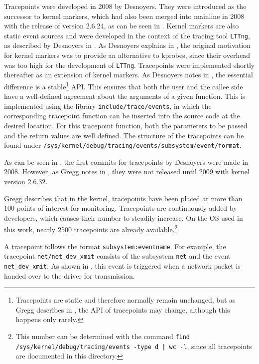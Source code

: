 Tracepoints were developed in 2008 by Desnoyers.  
They were introduced as the successor to kernel markers, which had also been merged into mainline in 2008 with the release of version 2.6.24, as can be seen in \cite{kernel_markers-changelog}.  
Kernel markers are also static event sources and were developed in the context of the tracing tool \texttt{LTTng}, as described by Desnoyers in \cite{lttng_kernel_markers}.  
As Desnoyers explains in \cite[p. 170]{Desnoyers2009}, the original motivation for kernel markers was to provide an alternative to \acp{kprobe}, since their overhead was too high for the development of \texttt{LTTng}.  
Tracepoints were implemented shortly thereafter as an extension of kernel markers.  
As Desnoyers notes in \cite[p. 171]{Desnoyers2009}, the essential difference is a stable\footnote{Tracepoints are static and therefore normally remain unchanged, but as Gregg describes in \cite[Chap. 2.9]{Gregg_2020}, the API of tracepoints may change, although this happens only rarely.} API.  
This ensures that both the user and the callee side have a well-defined agreement about the arguments of a given function.  
This is implemented using the library \texttt{include/trace/events}, in which the corresponding tracepoint function can be inserted into the source code at the desired location.  
For this tracepoint function, both the parameters to be passed and the return values are well defined.  
The structure of the tracepoints can be found under \texttt{/sys/kernel/debug/tracing/events/subsystem/event/format}.

As can be seen in \cite{tracepoints_commit}, the first commits for tracepoints by Desnoyers were made in 2008.  
However, as Gregg notes in \cite[Chap. 2.9]{Gregg_2020}, they were not released until 2009 with kernel version 2.6.32.  

Gregg describes that in the kernel, tracepoints have been placed at more than 100 points of interest for monitoring. 
Tracepoints are continuously added by developers, which causes their number to steadily increase.  
On the \ac{OS} used in this work, nearly 2500 tracepoints are already available.\footnote{This number can be determined with the command \texttt{find /sys/kernel/debug/tracing/events -type d | wc -l}, since all tracepoints are documented in this directory.}  

A tracepoint follows the format \texttt{subsystem:eventname}.  
For example, the tracepoint \texttt{net/net\_dev\_xmit} consists of the subsystem \texttt{net} and the event \texttt{net\_dev\_xmit}.  
As shown in \cite[Line 3831]{linux_xmit}, this event is triggered when a network packet is handed over to the driver for transmission.  

